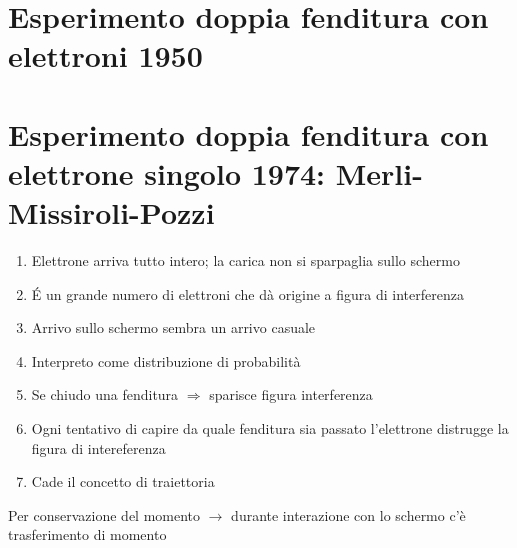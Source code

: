 \section*{Esperimento doppia fenditura con elettroni 1950}
\section*{Esperimento doppia fenditura con elettrone singolo 1974: Merli-Missiroli-Pozzi}
\begin{enumerate}
    \item Elettrone arriva tutto intero; la carica non si sparpaglia sullo schermo
    \item \'E un grande numero di elettroni che dà origine a figura di interferenza
    \item Arrivo sullo schermo sembra un arrivo casuale
    \item Interpreto come distribuzione di probabilità
    \item Se chiudo una fenditura $\Rightarrow$ sparisce figura interferenza
    \item Ogni tentativo di capire da quale fenditura sia passato l'elettrone distrugge la figura di intereferenza
    \item Cade il concetto di traiettoria 
\end{enumerate}
Per conservazione del momento $\rightarrow$ durante interazione con lo schermo c'è trasferimento di momento